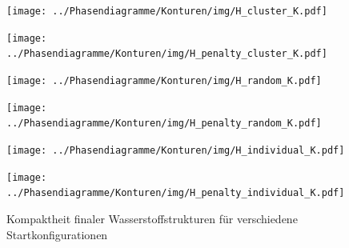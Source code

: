 \documentclass[a4paper, 10pt, twoside, openany]{book} %
\begin{document}
	\begin{figure}
		\begin{minipage}[t]{0.48\textwidth}
			\texttt{[image: ../Phasendiagramme/Konturen/img/H\_cluster\_K.pdf]}
			\label{H_cluster_K}
		\end{minipage}
		\hfill
		\begin{minipage}[t]{0.48\textwidth}
			\texttt{[image: ../Phasendiagramme/Konturen/img/H\_penalty\_cluster\_K.pdf]}
			\label{H_penalty_cluster_K}
		\end{minipage}
		\begin{minipage}[t]{0.48\textwidth}
			\texttt{[image: ../Phasendiagramme/Konturen/img/H\_random\_K.pdf]}
			\label{H_random_K}
		\end{minipage}
		\hfill
		\begin{minipage}[t]{0.48\textwidth}
			\texttt{[image: ../Phasendiagramme/Konturen/img/H\_penalty\_random\_K.pdf]}
			\label{H_penalty_random_K}
		\end{minipage}
		\begin{minipage}[t]{0.48\textwidth}
			\texttt{[image: ../Phasendiagramme/Konturen/img/H\_individual\_K.pdf]}
			\label{H_individual_K}
		\end{minipage}
		\hfill
		\begin{minipage}[t]{0.48\textwidth}
			\texttt{[image: ../Phasendiagramme/Konturen/img/H\_penalty\_individual\_K.pdf]}
			\label{H_penalty_individual_K}
		\end{minipage}
		\caption[Kompaktheit finaler Wasserstoffstrukturen]{Kompaktheit finaler Wasserstoffstrukturen für verschiedene Startkonfigurationen}
		\label{H_K}
	\end{figure}
	
\end{document}
